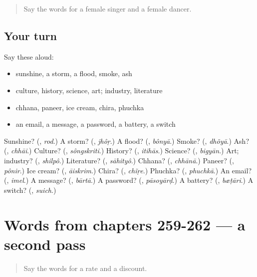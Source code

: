 \begin{quote}
Say the words for a female singer and a female dancer.
\end{quote}

\subsection*{Your turn}
Say these aloud:

\begin{itemize}
\raggedright
  \item sunshine, a storm, a flood, smoke, ash
  \item culture, history, science, art; industry, literature
  \item chhana, paneer, ice cream, chira, phuchka
  \item an email, a message, a password, a battery, a switch
\end{itemize}

\begin{tcolorbox}[breakable,colback=teal!4,colframe=teal!35!black,title={Before you move on}]
Sunshine? (\textbf{}, \emph{rod}.) A storm? (\textbf{}, \emph{jhôṛ}.) A flood? (\textbf{}, \emph{bônyā}.) Smoke? (\textbf{}, \emph{dhõyā}.) Ash? (\textbf{}, \emph{chhāi}.) Culture? (\textbf{}, \emph{sôngskriti}.) History? (\textbf{}, \emph{itihās}.) Science? (\textbf{}, \emph{bigyān}.) Art; industry? (\textbf{}, \emph{shilpô}.) Literature? (\textbf{}, \emph{sāhityô}.) Chhana? (\textbf{}, \emph{chhānā}.) Paneer? (\textbf{}, \emph{pônir}.) Ice cream? (\textbf{}, \emph{āiskrim}.) Chira? (\textbf{}, \emph{chĩṛe}.) Phuchka? (\textbf{}, \emph{phuchkā}.) An email? (\textbf{}, \emph{imel}.) A message? (\textbf{}, \emph{bārtā}.) A password? (\textbf{}, \emph{pāsoyārḍ}.) A battery? (\textbf{}, \emph{bæṭāri}.) A switch? (\textbf{}, \emph{suich}.)
\end{tcolorbox}
\section[(dialogue)]{Words from chapters 259-262 — a second pass}

\label{lesson:BN-R262-second-pass-words-from-chapters-259-262}



\begin{quote}
Say the words for a rate and a discount.
\end{quote}


